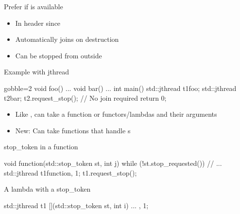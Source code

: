 \begin{frame}[fragile]
  \begin{goodpractice}{Prefer  if  is available}
    \begin{itemize}
    \item In  header since 
    \item Automatically joins on destruction
    \item Can be stopped from outside
    \end{itemize}
  \end{goodpractice}

  \begin{exampleblock}{Example with jthread}
    \begin{cppcode*}{gobble=2}
      void foo() {...}
      void bar() {...}
      int main() {
        std::jthread t1{foo};
        std::jthread t2{bar}; t2.request_stop();
        // No join required
        return 0;
      }
    \end{cppcode*}
  \end{exampleblock}
\end{frame}

\begin{frame}[fragile]
  \begin{block}{}
    \begin{itemize}
      \item Like ,  can take a function or functors/lambdas and their arguments
      \item New: Can take functions that handle s
    \end{itemize}
  \end{block}
  \begin{exampleblock}{stop\_token in a function}
    \begin{cppcode*}{}
    void function(std::stop_token st, int j) {
      while (!st.stop_requested()) {
        // ...
    }}
    std::jthread t1{function, 1};
    t1.request_stop();
    \end{cppcode*}
  \end{exampleblock}
  \begin{exampleblock}{A lambda with a stop\_token}
    \begin{cppcode*}{}
    std::jthread t1{
      [](std::stop_token st, int i){ ... }, 1};
    \end{cppcode*}
  \end{exampleblock}
\end{frame}


